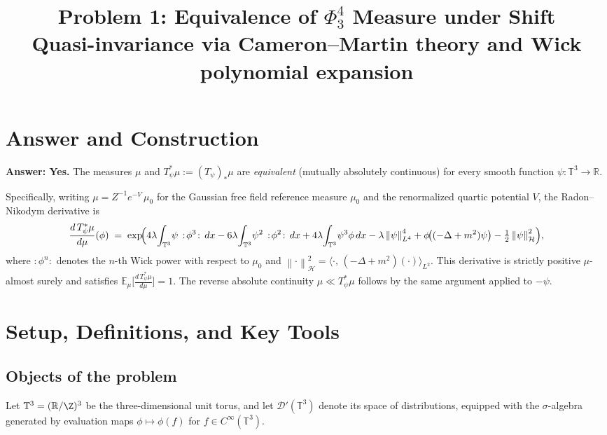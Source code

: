 \documentclass[11pt,a4paper]{article}
\title{\textbf{Problem 1: Equivalence of $\Phi^4_3$ Measure under Shift}\\[4pt]
\large Quasi-invariance via Cameron--Martin theory and Wick polynomial expansion}
\author{}
\date{}
\theoremstyle{definition}
\newcommand{\T}{\mathbb{T}}
\newcommand{\R}{\mathbb{R}}
\newcommand{\E}{\mathbb{E}}
\newcommand{\Dc}{\mathcal{D}}
\newcommand{\Hc}{\mathcal{H}}
\newcommand{\norm}[1]{\left\|#1\right\|}
\newcommand{\wick}[1]{:\!#1\!:}
\newcommand{\ip}[2]{\langle #1,\, #2 \rangle}
\begin{document}
\maketitle

\section*{Answer and Construction}

\noindent\textbf{Answer: Yes.}  The measures $\mu$ and $T_\psi^*\mu := (T_\psi)_*\mu$ are \emph{equivalent} (mutually absolutely continuous) for every smooth function $\psi:\T^3\to\R$.

Specifically, writing $\mu = Z^{-1}e^{-V}\,\mu_0$ for the Gaussian free field reference measure $\mu_0$ and the renormalized quartic potential $V$, the Radon--Nikodym derivative is
\begin{equation}\label{eq:RN_main}
\frac{d\,T_\psi^*\mu}{d\mu}(\phi)
\;=\;
\exp\!\Bigl(
  4\lambda\!\int_{\T^3}\!\psi\,\wick{\phi^3}\,dx
  -6\lambda\!\int_{\T^3}\!\psi^2\,\wick{\phi^2}\,dx
  +4\lambda\!\int_{\T^3}\!\psi^3\phi\,dx
  -\lambda\norm{\psi}_{L^4}^4
  +\phi\!\bigl((-\Delta+m^2)\psi\bigr)
  -\tfrac{1}{2}\norm{\psi}_{\Hc}^2
\Bigr),
\end{equation}
where $\wick{\phi^n}$ denotes the $n$-th Wick power with respect to $\mu_0$ and $\norm{\cdot}_\Hc^2 = \ip{\cdot}{(-\Delta+m^2)(\cdot)}_{L^2}$.
This derivative is strictly positive $\mu$-almost surely and satisfies $\E_\mu\bigl[\frac{d\,T_\psi^*\mu}{d\mu}\bigr]=1$.
The reverse absolute continuity $\mu\ll T_\psi^*\mu$ follows by the same argument applied to $-\psi$.

\section{Setup, Definitions, and Key Tools}

\subsection{Objects of the problem}

Let $\T^3 = (\R/\Z)^3$ be the three-dimensional unit torus, and let $\Dc'(\T^3)$ denote its space of distributions, equipped with the $\sigma$-algebra generated by evaluation maps $\phi\mapsto\phi(f)$ for $f\in C^\infty(\T^3)$.
\end{document}
